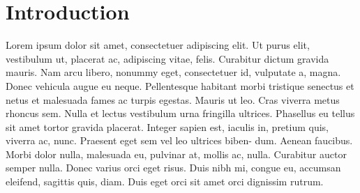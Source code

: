 \chapter{Introduction}
Lorem ipsum dolor sit amet, consectetuer adipiscing elit. Ut purus elit, vestibulum ut,
placerat ac, adipiscing vitae, felis. Curabitur dictum gravida mauris. Nam arcu libero,
nonummy eget, consectetuer id, vulputate a, magna. Donec vehicula augue eu neque.
Pellentesque habitant morbi tristique senectus et netus et malesuada fames ac turpis
egestas. Mauris ut leo. Cras viverra metus rhoncus sem. Nulla et lectus vestibulum urna
fringilla ultrices. Phasellus eu tellus sit amet tortor gravida placerat. Integer sapien
est, iaculis in, pretium quis, viverra ac, nunc. Praesent eget sem vel leo ultrices
biben- dum. Aenean faucibus. Morbi dolor nulla, malesuada eu, pulvinar at, mollis ac,
nulla. Curabitur auctor semper nulla. Donec varius orci eget risus. Duis nibh mi,
congue eu, accumsan eleifend, sagittis quis, diam. Duis eget orci sit amet orci
dignissim rutrum.